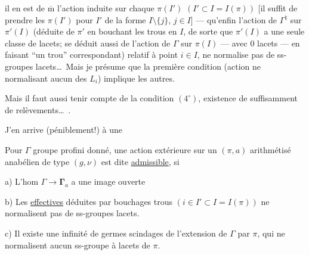 
il en est de $\overline{\mathrm m}$  l'action induite sur chaque $\pi(I')$ $(I'\subset I=I(\pi))$ [il suffit de prendre les $\pi(I')$ pour $I'$ de la forme $I\setminus\{j\}$, $j\in I$] ---  qu'enfin l'action de $\Gamma^{\natural}$  sur $\pi'(I)$ (déduite de $\pi'$ en bouchant les trous en $I$, de sorte que $\pi'(I)$ a une seule classe de lacets;  se déduit aussi de l'action  de $\Gamma$ sur $\pi(I)$ --- avec $0$  lacets --- en faisant ``un trou'' correspondant) relatif à  point $i\in I$, ne normalise pas de ss-groupes lacets\ldots\ Mais je présume que la première condition (action  ne normalisant aucun des $L_i$) implique les autres.


Mais il faut  aussi tenir compte de la condition $(4^\circ)$, existence de suffisamment de relèvements\ldots\ .

J'en arrive (péniblement!) à une

 Pour $\Gamma$ groupe profini donné, une action extérieure sur un $(\pi,a)$ arithmétisé anabélien de type $(g,\nu)$ est dite \uline{admissible}, si


a)  L'hom $\Gamma\longrightarrow\boldsymbol{\Gamma}_a$ a une image ouverte

b) Les  \uline{effectives} déduites par bouchages  trous $(i\in I'\subset I=I(\pi))$ ne normalisent pas de ss-groupes lacets.


c) Il existe une infinité de  germes  scindages de l'extension de $\Gamma$ par $\pi$, qui ne normalisent aucun ss-groupe à lacets de $\pi$.


